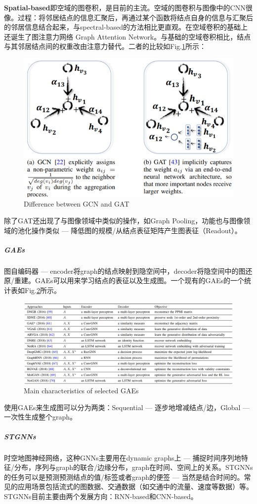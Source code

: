 \textbf{Spatial-based}即空域的图卷积，是目前的主流。空域的图卷积与图像中的CNN很像。过程：将邻居结点的信息汇聚后，再通过某个函数将结点自身的信息与汇聚后的邻居信息结合起来，与spectral-based的方法相比更直观。在空域卷积的基础上还诞生了图注意力网络 Graph Attention Network。与基础的空域卷积相比，结点与其邻居结点间的权重改由注意力替代。二者的比较如Fig.\ref{fig:gcn_gat}所示：
\begin{figure}[h]
	\centering
	\includegraphics[width=.8\textwidth]{pics/gcn_gat.png}
	\caption{Difference between GCN and GAT}
	\label{fig:gcn_gat}
\end{figure}

除了GAT还出现了与图像领域中类似的操作，如Graph Pooling，功能也与图像领域的池化操作类似 --- 降低图的规模/从结点表征矩阵产生图表征（Readout）。

\subparagraph{GAEs}
图自编码器 --- encoder将graph的结点映射到隐空间中，decoder将隐空间中的图还原/重建。GAEs可以用来学习结点的表征以及生成图。一个现有的GAEs的一个统计表如Fig.\ref{fig:gaes}所示。
\begin{figure}[h]
	\centering
	\includegraphics[width=.8\textwidth]{pics/gaes.png}
	\caption{ Main characteristics of selected GAEs}
	\label{fig:gaes}
\end{figure}
使用GAEs来生成图可以分为两类：Sequential --- 逐步地增减结点/边，Global --- 一次性生成整个graph。

\subparagraph{STGNNs}
时空地图神经网络，这种GNNs主要用在dynamic graphs上 --- 捕捉时间序列地特征/分布，序列与graph的联合/边缘分布，graph在时间、空间上的关系。STGNNs的任务可以是预测预测结点的值/标签或者graph的便签 --- 当然是结合时间的。常见的应用场景包括流式的图数据、交通数据（如交通中的流量、速度等数据）等。STGNNs目前主要由两个发展方向：RNN-based和CNN-based。

